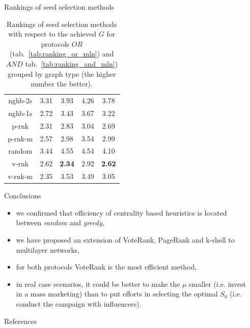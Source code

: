\documentclass[final]{beamer}
\newlength{\sepwidth}
\newlength{\colwidth}
\newcommand{\separatorcolumn}{\begin{column}{\sepwidth}\end{column}}
\begin{document}
\begin{frame}[t]
\begin{columns}[t]
\begin{column}{\colwidth}
\begin{block}{Rankings of seed selection methods}
\begin{table}
\begin{subtable}{0.45\textwidth}
{\begin{tabular}{ccccc}
        nghb-2s & 3.31 & 3.93 & 4.26 & 3.78 \\
        nghb-1s & 2.72 & 3.43 & 3.67 & 3.22 \\
        p-rnk   & 2.31 & 2.83 & 3.04 & 2.69 \\
        p-rnk-m & 2.57 & 2.98 & 3.54 & 2.99 \\
        random  & 3.44 & 4.55 & 4.54 & 4.10  \\
        v-rnk   & 2.62 & \textbf{2.34} & 2.92 & \textbf{2.62} \\
        v-rnk-m & 2.35 & 3.53 & 3.49 & 3.05 \\ \hline
        \end{tabular}%
        }
        \label{tab:ranking_and_mln}
    \end{subtable}
    \caption{Rankings of seed selection methods with respect to the achieved $G$ for protocols $OR$ (tab.~\ref{tab:ranking_or_mln}) and $AND$ tab.~\ref{tab:ranking_and_mln}) grouped by graph type (the higher number the better).}
    \label{tab:ranking_mln}
    \end{table}
\end{block}
    
\begin{exampleblock}{Conclusions}
    \begin{itemize}
        \item we confirmed that efficiency of centrality based heuristics is located between \textit{random} and \textit{greedy},
        \item we have proposed an extension of VoteRank, PageRank and k-shell to multilayer networks,
        \item for both protocols VoteRank is the most efficient method,
        \item in real case scenarios, it could be better to make the $\mu$ smaller (i.e. invest in a mass marketing) than to put efforts in selecting the optimal $S_{0}$ (i.e. conduct the campaign with influencers).
    \end{itemize}
\end{exampleblock}

\begin{block}{References}
    \printbibliography
\end{block}

\end{column}
\separatorcolumn

\end{columns}
\end{frame}
\end{document}
